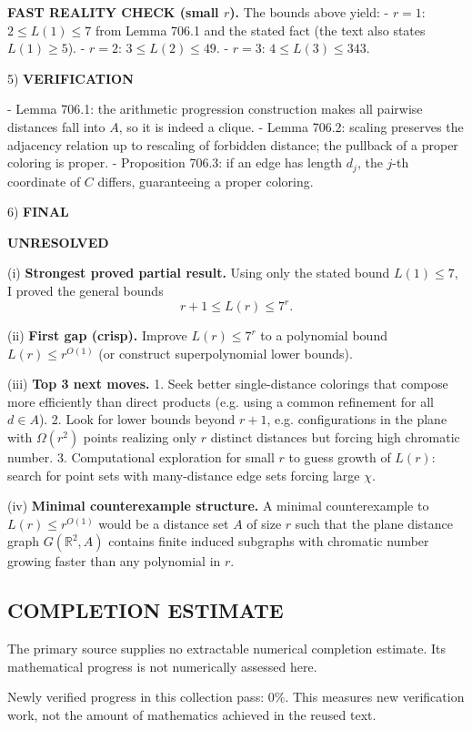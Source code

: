 \textbf{FAST REALITY CHECK (small $r$).}
The bounds above yield:
- $r=1$: $2\le L(1)\le 7$ from Lemma 706.1 and the stated fact (the text also states $L(1)\ge 5$).
- $r=2$: $3\le L(2)\le 49$.
- $r=3$: $4\le L(3)\le 343$.

5) \textbf{VERIFICATION}

- Lemma 706.1: the arithmetic progression construction makes all pairwise distances fall into $A$, so it is indeed a clique.
- Lemma 706.2: scaling preserves the adjacency relation up to rescaling of forbidden distance; the pullback of a proper coloring is proper.
- Proposition 706.3: if an edge has length $d_j$, the $j$-th coordinate of $C$ differs, guaranteeing a proper coloring.

6) \textbf{FINAL}

\textbf{UNRESOLVED}

(i) \textbf{Strongest proved partial result.}
Using only the stated bound $L(1)\le 7$, I proved the general bounds
\[
 r+1\le L(r)\le 7^r.
\]

(ii) \textbf{First gap (crisp).}
Improve $L(r)\le 7^r$ to a polynomial bound $L(r)\le r^{O(1)}$ (or construct superpolynomial lower bounds).

(iii) \textbf{Top 3 next moves.}
1. Seek better single-distance colorings that compose more efficiently than direct products (e.g. using a common refinement for all $d\in A$).
2. Look for lower bounds beyond $r+1$, e.g. configurations in the plane with $\Omega(r^2)$ points realizing only $r$ distinct distances but forcing high chromatic number.
3. Computational exploration for small $r$ to guess growth of $L(r)$: search for point sets with many-distance edge sets forcing large $\chi$.

(iv) \textbf{Minimal counterexample structure.}
A minimal counterexample to $L(r)\le r^{O(1)}$ would be a distance set $A$ of size $r$ such that the plane distance graph $G(\mathbb{R}^2,A)$ contains finite induced subgraphs with chromatic number growing faster than any polynomial in $r$.




\subsection*{COMPLETION ESTIMATE}
The primary source supplies no extractable numerical completion estimate. Its mathematical progress is not numerically assessed here.

Newly verified progress in this collection pass: $0\%$. This measures new verification work, not the amount of mathematics achieved in the reused text.
